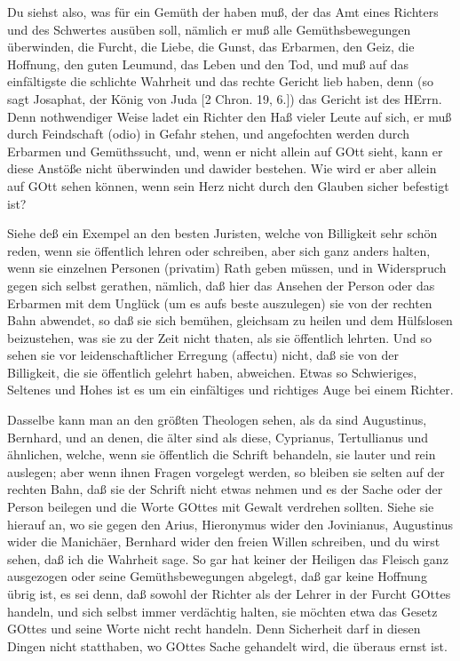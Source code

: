 Du siehst also, was für ein Gemüth der haben muß, der das Amt eines Richters und des Schwertes ausüben soll, nämlich er muß alle Gemüthsbewegungen überwinden, die Furcht, die Liebe, die Gunst, das Erbarmen, den Geiz, die Hoffnung, den guten Leumund, das Leben und den Tod, und muß auf das einfältigste die schlichte Wahrheit und das rechte Gericht lieb haben, denn (so sagt Josaphat, der König von Juda [2 Chron. 19, 6.]) das Gericht ist des HErrn. Denn nothwendiger Weise ladet ein Richter den Haß vieler Leute auf sich, er muß durch Feindschaft (odio) in Gefahr stehen, und angefochten werden durch Erbarmen und Gemüthssucht, und, wenn er nicht allein auf GOtt sieht, kann er diese Anstöße nicht überwinden und dawider bestehen. Wie wird er aber allein auf GOtt sehen können, wenn sein Herz nicht durch den Glauben sicher befestigt ist?

Siehe deß ein Exempel an den besten Juristen, welche von Billigkeit sehr schön reden, wenn sie öffentlich lehren oder schreiben, aber sich ganz anders halten, wenn sie einzelnen Personen (privatim) Rath geben müssen, und in Widerspruch gegen sich selbst gerathen, nämlich, daß hier das Ansehen der Person oder das Erbarmen mit dem Unglück (um es aufs beste auszulegen) sie von der rechten Bahn abwendet, so daß sie sich bemühen, gleichsam zu heilen und dem Hülfslosen beizustehen, was sie zu der Zeit nicht thaten, als sie öffentlich lehrten. Und so sehen sie vor leidenschaftlicher Erregung (affectu) nicht, daß sie von der Billigkeit, die sie öffentlich gelehrt haben, abweichen. Etwas so Schwieriges, Seltenes und Hohes ist es um ein einfältiges und richtiges Auge bei einem Richter.

Dasselbe kann man an den größten Theologen sehen, als da sind Augustinus, Bernhard, und an denen, die älter sind als diese, Cyprianus, Tertullianus und ähnlichen, welche, wenn sie öffentlich die Schrift behandeln, sie lauter und rein auslegen; aber wenn ihnen Fragen vorgelegt werden, so bleiben sie selten auf der rechten Bahn, daß sie der Schrift nicht etwas nehmen und es der Sache oder der Person beilegen und die Worte GOttes mit Gewalt verdrehen sollten. Siehe sie hierauf an, wo sie gegen den Arius, Hieronymus wider den Jovinianus, Augustinus wider die Manichäer, Bernhard wider den freien Willen schreiben, und du wirst sehen, daß ich die Wahrheit sage. So gar hat keiner der Heiligen das Fleisch ganz ausgezogen oder seine Gemüthsbewegungen abgelegt, daß gar keine Hoffnung übrig ist, es sei denn, daß sowohl der Richter als der Lehrer in der Furcht GOttes handeln, und sich selbst immer verdächtig halten, sie möchten etwa das Gesetz GOttes und seine Worte nicht recht handeln. Denn Sicherheit darf in diesen Dingen nicht statthaben, wo GOttes Sache gehandelt wird, die überaus ernst ist.

